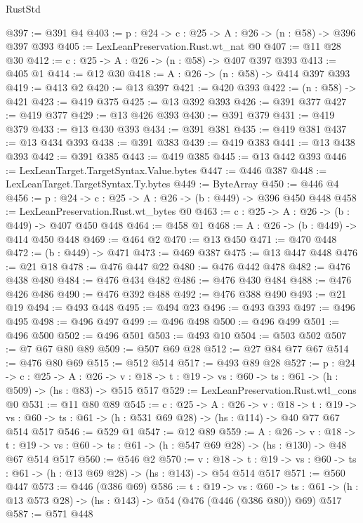 \begin{lexlean}{RustStd}
\begin{coremodule}
{\begin{coremodule}
{{{{{{{{{{{{{{{{{{{{{{{{{{{{{{{{{{{{{{@397 := @391 @4
@403 := {p : @24} -> {c : @25} -> {A : @26} -> (n : @58) -> @396 @397 @393
@405 := LexLeanPreservation.Rust.wt_nat @0
@407 := @11 @28 @30
@412 := {c : @25} -> {A : @26} -> (n : @58) -> @407 @397 @393
@413 := @405 @1
@414 := @12 @30
@418 := {A : @26} -> (n : @58) -> @414 @397 @393
@419 := @413 @2
@420 := @13 @397
@421 := @420 @393
@422 := (n : @58) -> @421
@423 := @419 @375
@425 := @13 @392 @393
@426 := @391 @377
@427 := @419 @377
@429 := @13 @426 @393
@430 := @391 @379
@431 := @419 @379
@433 := @13 @430 @393
@434 := @391 @381
@435 := @419 @381
@437 := @13 @434 @393
@438 := @391 @383
@439 := @419 @383
@441 := @13 @438 @393
@442 := @391 @385
@443 := @419 @385
@445 := @13 @442 @393
@446 := LexLeanTarget.TargetSyntax.Value.bytes
@447 := @446 @387
@448 := LexLeanTarget.TargetSyntax.Ty.bytes
@449 := ByteArray
@450 := @446 @4
@456 := {p : @24} -> {c : @25} -> {A : @26} -> (b : @449) -> @396 @450 @448
@458 := LexLeanPreservation.Rust.wt_bytes @0
@463 := {c : @25} -> {A : @26} -> (b : @449) -> @407 @450 @448
@464 := @458 @1
@468 := {A : @26} -> (b : @449) -> @414 @450 @448
@469 := @464 @2
@470 := @13 @450
@471 := @470 @448
@472 := (b : @449) -> @471
@473 := @469 @387
@475 := @13 @447 @448
@476 := @21 @18
@478 := @476 @447 @22
@480 := @476 @442 @478
@482 := @476 @438 @480
@484 := @476 @434 @482
@486 := @476 @430 @484
@488 := @476 @426 @486
@490 := @476 @392 @488
@492 := @476 @388 @490
@493 := @21 @19
@494 := @493 @448
@495 := @494 @23
@496 := @493 @393
@497 := @496 @495
@498 := @496 @497
@499 := @496 @498
@500 := @496 @499
@501 := @496 @500
@502 := @496 @501
@503 := @493 @10
@504 := @503 @502
@507 := @7 @67 @80 @89
@509 := @507 @69 @28
@512 := @27 @84 @77 @67
@514 := @476 @80 @69
@515 := @512 @514
@517 := @493 @89 @28
@527 := {p : @24} ->
  {c : @25} ->
  {A : @26} ->
  {v : @18} -> {t : @19} -> {vs : @60} -> {ts : @61} -> (h : @509) -> (hs : @83) -> @515 @517
@529 := LexLeanPreservation.Rust.wtl_cons @0
@531 := @11 @80 @89
@545 := {c : @25} ->
  {A : @26} ->
  {v : @18} ->
  {t : @19} ->
  {vs : @60} -> {ts : @61} -> (h : @531 @69 @28) -> (hs : @114) -> @40 @77 @67 @514 @517
@546 := @529 @1
@547 := @12 @89
@559 := {A : @26} ->
  {v : @18} ->
  {t : @19} -> {vs : @60} -> {ts : @61} -> (h : @547 @69 @28) -> (hs : @130) -> @48 @67 @514 @517
@560 := @546 @2
@570 := {v : @18} ->
  {t : @19} -> {vs : @60} -> {ts : @61} -> (h : @13 @69 @28) -> (hs : @143) -> @54 @514 @517
@571 := @560 @447
@573 := @446 (@386 @69)
@586 := {t : @19} ->
  {vs : @60} ->
  {ts : @61} -> (h : @13 @573 @28) -> (hs : @143) -> @54 (@476 (@446 (@386 @80)) @69) @517
@587 := @571 @448
}}}}}}}}}}}}}}}}}}}}}}}}}}}}}}}}}}}}}}
\end{coremodule}}
\end{coremodule}
\end{lexlean}
